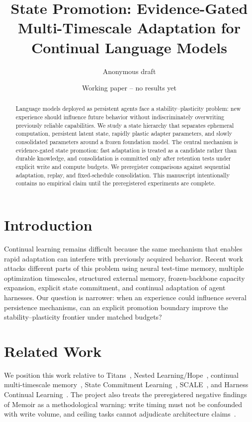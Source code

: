 \documentclass[11pt]{article}
\title{State Promotion: Evidence-Gated Multi-Timescale Adaptation for Continual Language Models}
\author{Anonymous draft}
\date{Working paper -- no results yet}
\begin{document}
\maketitle

\begin{abstract}
Language models deployed as persistent agents face a stability--plasticity problem: new experience should influence future behavior without indiscriminately overwriting previously reliable capabilities. We study a state hierarchy that separates ephemeral computation, persistent latent state, rapidly plastic adapter parameters, and slowly consolidated parameters around a frozen foundation model. The central mechanism is evidence-gated state promotion: fast adaptation is treated as a candidate rather than durable knowledge, and consolidation is committed only after retention tests under explicit write and compute budgets. We preregister comparisons against sequential adaptation, replay, and fixed-schedule consolidation. This manuscript intentionally contains no empirical claim until the preregistered experiments are complete.
\end{abstract}

\section{Introduction}
Continual learning remains difficult because the same mechanism that enables rapid adaptation can interfere with previously acquired behavior. Recent work attacks different parts of this problem using neural test-time memory, multiple optimization timescales, structured external memory, frozen-backbone capacity expansion, explicit state commitment, and continual adaptation of agent harnesses. Our question is narrower: when an experience could influence several persistence mechanisms, can an explicit promotion boundary improve the stability--plasticity frontier under matched budgets?

\section{Related Work}
We position this work relative to Titans~\cite{behrouz2025titans}, Nested Learning/Hope~\cite{behrouz2025nested}, continual multi-timescale memory~\cite{pattichis2026memini}, State Commitment Learning~\cite{ding2026statecommit}, SCALE~\cite{lee2026scale}, and Harness Continual Learning~\cite{kang2026hcl}. The project also treats the preregistered negative findings of Memoir as a methodological warning: write timing must not be confounded with write volume, and ceiling tasks cannot adjudicate architecture claims~\cite{memoir2026}.
\end{document}
